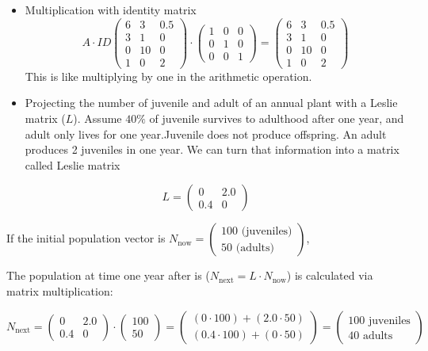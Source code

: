 \documentclass[
  letterpaper,
  DIV=11,
  numbers=noendperiod]{scrreprt}
\begin{document}
\begin{itemize}
\item
  Multiplication with identity matrix \[ A \cdot ID
  \begin{pmatrix}
    6 & 3 & 0.5 \\
    3 & 1 & 0 \\
    0 & 10 & 0 \\
    1 & 0 & 2
  \end{pmatrix}
  \cdot
  \begin{pmatrix}
    1 & 0 & 0 \\
    0 & 1 & 0 \\
    0 & 0 & 1
  \end{pmatrix}
  =
  \begin{pmatrix}
    6 & 3 & 0.5 \\
    3 & 1 & 0 \\
    0 & 10 & 0 \\
    1 & 0 & 2
  \end{pmatrix}
  \] This is like multiplying by one in the arithmetic operation.
\item
  Projecting the number of juvenile and adult of an annual plant with a
  Leslie matrix (\(L\)). Assume \(40\%\) of juvenile survives to
  adulthood after one year, and adult only lives for one year.Juvenile
  does not produce offspring. An adult produces 2 juveniles in one year.
  We can turn that information into a matrix called Leslie matrix
\end{itemize}

\[
L =
\begin{pmatrix}
0 & 2.0 \\
0.4 & 0
\end{pmatrix}
\]

If the initial population vector is \(N_{\text{now}} =
\begin{pmatrix}
  100 \text{ (juveniles)} \\
  50 \text{ (adults)}
\end{pmatrix}\),

The population at time one year after is
(\(N_\text{next} = L \cdot N_{\text{now}}\)) is calculated via matrix
multiplication:

\[
N_\text{next} =
\begin{pmatrix}
    0 & 2.0 \\
    0.4 & 0
\end{pmatrix}
\cdot
\begin{pmatrix}
100 \\
50
\end{pmatrix} =
\begin{pmatrix}
(0 \cdot 100) + (2.0 \cdot 50) \\
(0.4 \cdot 100) + (0 \cdot 50)
\end{pmatrix}
=
\begin{pmatrix}
100 \text{ juveniles} \\
40 \text{ adults}
\end{pmatrix}
\]
\end{document}
